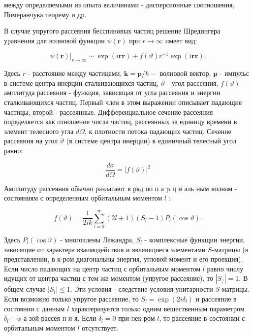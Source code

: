 \documentclass[10pt]{article}
\begin{document}
между определяемыми из опыта величинами - дисперсионные соотношения, Померанчука теорему и др.



В случае упругого рассеяния бесспиновых частиц решение Шредингера уравнения для волновой функции $\psi(\boldsymbol{r})$ при $r \rightarrow \infty$ имеет вид:



\[

\left.\psi(\boldsymbol{r})\right|_{r \rightarrow \infty} \sim \exp (i \boldsymbol{r} \boldsymbol{r})+f(\vartheta) r^{-1} \exp (i \boldsymbol{r} \boldsymbol{r}) .

\]



Здесь $r$ - расстояние между частицами, $\boldsymbol{k}=\boldsymbol{p} / \hbar-$ волновой вектор, $\boldsymbol{p}$ - импульс в системе центра инерции сталкивающихся частиц, $\vartheta$ - угол рассеяния, $f(\vartheta)$ - амплитуда рассеяния - функция, зависящая от угла рассеяния и энергии сталкивающихся частиц. Первый член в этом выражении описывает падающие частицы, второй - рассеянные. Дифференциальное сечение рассеяния определяется как отношение числа частиц, рассеянных за единицу времени в элемент телесного угла $d \Omega$, к плотности потока падающих частиц. Сечение рассеяния на угол $\vartheta$ (в системе центра инерции) в единичный телесный угол равно:



\[

\frac{d \sigma}{d \Omega}=|f(\vartheta)|^{2}

\]



Амплитуду рассеяния обычно разлагают в ряд по п а $\mathrm{p}$ ц и аль ным волнам - состояниям с определенным орбитальным моментом $l$ :



\[

f(\vartheta)=\frac{1}{2 i k} \sum_{l=0}^{\infty}(2 l+1)\left(S_{l}-1\right) P_{l}(\cos \vartheta) .

\]



Здесь $P_{l}(\cos \vartheta)$ - многочлены Лежандра, $S_{l}$ - комплексные функщии энергии, зависящие от характера взаимодействия и являющиеся элементами $S$-матрицы (в представлении, в к-ром диагональны энергия, угловой момент и его проекция). Если число падающих на центр частиц с орбитальным моментом $l$ равно числу идущих от центра частиц с тем же моментом (упругое рассеяние), то $\left|S_{/}\right|=1$. В общем случае $\left|S_{l}\right| \leqslant 1$. Эти условия - следствие условия унитарности $S$-матрицы. Если возможно только упругое рассеяние, то $S_{l}=\exp \left(2 i \delta_{l}\right)$ и рассеяние в состоянии с данным $l$ характеризуется только одним вещественным параметром $\delta_{l}-\phi$ а зой рассея н и я. Если $\delta_{l}=0$ при нек-ром $l$, то рассеяние в состоянии с орбитальным моментом $l$ отсутствует.
\end{document}

